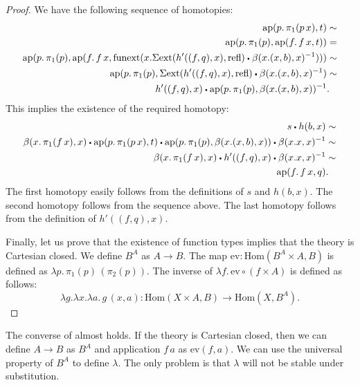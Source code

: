 \documentclass[reqno]{mscs}
\newcommand{\fs}[1]{\mathrm{#1}}
\newcommand{\Hom}{\fs{Hom}}
\newcommand{\refl}{\fs{refl}}
\newcommand{\sym}[1]{#1^{-1}}
\newcommand{\pmap}{\fs{ap}}
\numberwithin{figure}{section}
\newcommand{\ct}{%
  \mathchoice{\mathbin{\raisebox{0.25ex}{$\displaystyle\centerdot$}}}%
             {\mathbin{\raisebox{0.25ex}{$\centerdot$}}}%
             {\mathbin{\raisebox{0.25ex}{$\scriptstyle\,\centerdot\,$}}}%
             {\mathbin{\raisebox{0.25ex}{$\scriptscriptstyle\,\centerdot\,$}}}
}
\begin{document}
\begin{proof}
We have the following sequence of homotopies:
\begin{align*}
\pmap(p.\,\pi_1(p\,x),t) & \sim \\
\pmap(p.\,\pi_1(p),\pmap(f.\,f\,x,t)) & = \\
\pmap(p.\,\pi_1(p),\pmap(f.\,f\,x, \fs{funext}(x. \Sigma \fs{ext}(h'((f,q),x),\refl) \ct \sym{\beta(x.(x,b),x)}))) & \sim \\
\pmap(p.\,\pi_1(p), \Sigma \fs{ext}(h'((f,q),x),\refl) \ct \sym{\beta(x.(x,b),x)}) & \sim \\
h'((f,q),x) \ct \sym{\pmap(p.\,\pi_1(p), \beta(x.(x,b),x))} & .
\end{align*}
This implies the existence of the required homotopy:
\begin{align*}
s \ct h(b,x) & \sim \\
\beta(x.\,\pi_1(f\,x),x) \ct \pmap(p.\,\pi_1(p\,x),t) \ct \pmap(p.\,\pi_1(p), \beta(x.(x,b),x)) \ct \sym{\beta(x.x,x)} & \sim \\
\beta(x.\,\pi_1(f\,x),x) \ct h'((f,q),x) \ct \sym{\beta(x.x,x)} & \sim \\
\pmap(f.\,f\,x,q) & .
\end{align*}
The first homotopy easily follows from the definitions of $s$ and $h(b,x)$.
The second homotopy follows from the sequence above.
The last homotopy follows from the definition of $h'((f,q),x)$.

Finally, let us prove that the existence of function types implies that the theory is Cartesian closed.
We define $B^A$ as $A \to B$.
The map $\fs{ev} : \Hom(B^A \times A, B)$ is defined as $\lambda p.\,\pi_1(p)\,(\pi_2(p))$.
The inverse of $\lambda f.\,\fs{ev} \circ (f \times A)$ is defined as follows:
\[ \lambda g. \lambda x. \lambda a.\, g\,(x,a) : \Hom(X \times A, B) \to \Hom(X, B^A). \]
\end{proof}

\begin{remark}
The converse of  almost holds.
If the theory is Cartesian closed, then we can define $A \to B$ as $B^A$ and application $f\,a$ as $\fs{ev}(f,a)$.
We can use the universal property of $B^A$ to define $\lambda$.
The only problem is that $\lambda$ will not be stable under substitution.
\end{remark}
\end{document}
